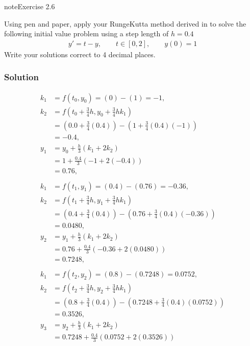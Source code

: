 \documentclass[letterpaper,10pt,english]{jupyterBook}
\begin{document}
\begin{sphinxadmonition}{note}{Exercise 2.6}

\sphinxAtStartPar
Using pen and paper, apply your Runge\sphinxhyphen{}Kutta method derived in {\hyperref[\detokenize{2_ERKs/2.5_ERK_Exercises:ex2-3}]{}} to solve the following initial value problem using a step length of \(h=0.4\)
\begin{align*}
    y' =t-y, \qquad t\in [0,2],\qquad y(0)=1
\end{align*}
\sphinxAtStartPar
Write your solutions correct to 4 decimal places.
\subsubsection*{Solution}
\begin{align*}
    k_1 &= f(t_0, y_0) = (0) - (1) = -1, \\
    k_2 &= f(t_0 + \tfrac{3}{4} h, y_0 + \tfrac{3}{4} hk_1) \\
    &= (0.0 + \tfrac{3}{4}(0.4)) - (1 + \tfrac{3}{4}(0.4)(-1)) \\
    &= -0.4, \\
    y_1 &= y_0 + \frac{h}{3}(k_1 + 2 k_2) \\
    &= 1 + \frac{0.4}{3}(-1 + 2(-0.4)) \\
    &= 0.76, \\
    \\
    k_1 &= f(t_1, y_1) = (0.4) - (0.76) = -0.36, \\
    k_2 &= f(t_1 + \tfrac{3}{4} h, y_1 + \tfrac{3}{4} hk_1) \\
    &= (0.4 + \tfrac{3}{4}(0.4)) - (0.76 + \tfrac{3}{4}(0.4)(-0.36)) \\
    &= 0.0480, \\
    y_2 &= y_1 + \frac{h}{3}(k_1 + 2 k_2) \\
    &= 0.76 + \frac{0.4}{3}(-0.36 + 2(0.0480)) \\
    &= 0.7248, \\
    \\
    k_1 &= f(t_2, y_2) = (0.8) - (0.7248) = 0.0752, \\
    k_2 &= f(t_2 + \tfrac{3}{4} h, y_2 + \tfrac{3}{4} hk_1) \\
    &= (0.8 + \tfrac{3}{4}(0.4)) - (0.7248 + \tfrac{3}{4}(0.4)(0.0752)) \\
    &= 0.3526, \\
    y_3 &= y_2 + \frac{h}{3}(k_1 + 2 k_2) \\
    &= 0.7248 + \frac{0.4}{3}(0.0752 + 2(0.3526)) \\

\end{align*}
\end{sphinxadmonition}
\end{document}
